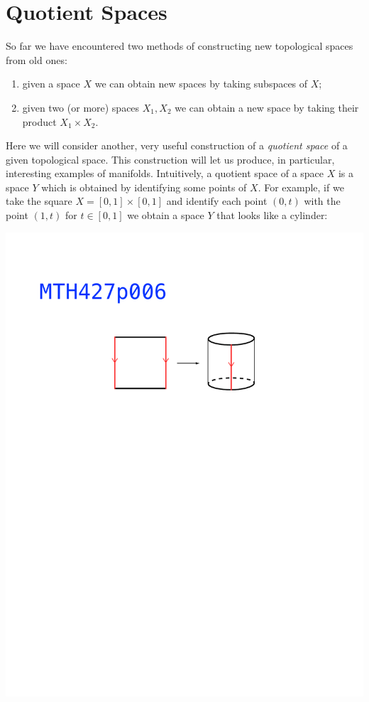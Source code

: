 \documentclass[11pt, letterpaper, oneside]{report}
\renewcommand{\chaptermark}[1]{\markboth{#1}{}}
\theoremstyle{pplain}
\newtheorem{ITERMVALUE THM}[theorem]{Intermediate Value Theorem}
\newtheorem{HEINEBOREL THM}[theorem]{Heine-Borel Theorem}
\newtheorem{UMETR THM}[theorem]{Urysohn Metrization Theorem}
\newtheorem{UMETR2 THM}[theorem]{Urysohn Metrization Theorem (v.2)}
\theoremstyle{ddefinition}
\theoremstyle{nnn}
\newtheorem{TDA NN}[theorem]{Topological Data Analysis. }
\theoremstyle{eexercise}
\newcommand{\benu}{\begin{enumerate}}
\newcommand{\eenu}{\end{enumerate}}
\begin{document}
\newpage

\chapter{Quotient Spaces}
\chaptermark{Quotient Spaces}

\thispagestyle{firststyle}

So far we have encountered two methods of constructing new topological spaces 
from old ones: 
\benu 
\item[\textbullet] given a space $X$ we can obtain new spaces by taking subspaces of $X$; 
\item[\textbullet] given two (or more) spaces $X_{1}, X_{2}$ we can obtain a new space by taking 
their product $X_{1}\times X_{2}$. 
\eenu

Here we will consider  another, very useful construction of  a \emph{quotient space} 
of a given topological space. This construction will let us produce, in particular,  interesting 
examples of manifolds. Intuitively, a quotient space 
of a space $X$ is a space $Y$ which is obtained by identifying some points of $X$. For example, if we 
take the square $X = [0,1]\times [0,1]$  and identify each point $(0,t)$ with the 
point $(1, t)$ for $t\in [0,1]$ we obtain a space $Y$ that looks like a cylinder:

{{\includegraphics[width=\textwidth, trim=0mm 183mm 0mm 57mm, clip]{pictures/MTH427p006.pdf}}}
\end{document}
